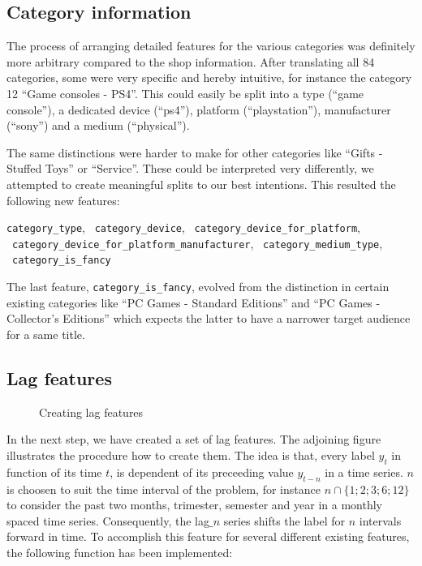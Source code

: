\subsection{Category information}

The process of arranging detailed features for the various categories was definitely more arbitrary compared to the shop information. After translating all 84 categories, some were very specific and hereby intuitive, for instance the category 12 \enquote{Game consoles - PS4}. This could easily be split into a type (\enquote{game console}), a dedicated device (\enquote{ps4}), platform (\enquote{playstation}), manufacturer (\enquote{sony}) and a medium (\enquote{physical}).

The same distinctions were harder to make for other categories like \enquote{Gifts - Stuffed Toys} or \enquote{Service}. These could be interpreted very differently, we attempted to create meaningful splits to our best intentions. This resulted the following new features:
\vspace*{-2mm}
\begin{center}
\texttt{category\_type}, \ \texttt{category\_device}, \ \texttt{category\_device\_for\_platform}, \ \texttt{category\_device\_for\_platform\_manufacturer}, \ \texttt{category\_medium\_type}, \ \texttt{category\_is\_fancy}
\end{center}
The last feature, \texttt{category\_is\_fancy}, evolved from the distinction in certain existing categories like \enquote{PC Games - Standard Editions} and \enquote{PC Games - Collector's Editions} which expects the latter to have a narrower target audience for a same title.

\subsection{Lag features}

\begin{wrapfigure}[8]{l}{0.48\textwidth}
\centering

\captionsetup{justification=centering}
\caption{Creating lag features}
\label{lag}
\end{wrapfigure}


In the next step, we have created a set of lag features. The adjoining figure illustrates the procedure how to create them. The idea is that, every label $y_t$ in function of its time $t$, is dependent of its preceeding value $y_{t-n}$ in a time series. $n$ is choosen to suit the time interval of the problem, for instance $n \cap \{1;2;3;6;12\}$ to consider the past two months, trimester, semester and year in a monthly spaced time series. Consequently, the lag$\_n$ series shifts the label for $n$ intervals forward in time. To accomplish this feature for several different existing features, the following function has been implemented:

